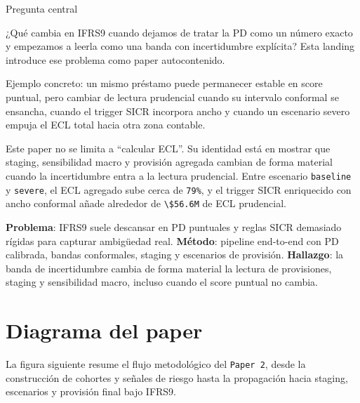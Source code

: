 \documentclass[
  spanish,
  11pt,
  letterpaper,
]{scrbook}
\theoremstyle{plain}
\theoremstyle{remark}
\begin{document}
{Pregunta central}

¿Qué cambia en IFRS9 cuando dejamos de tratar la PD como un número
exacto y empezamos a leerla como una banda con incertidumbre explícita?
Esta landing introduce ese problema como paper autocontenido.

Ejemplo concreto: un mismo préstamo puede permanecer estable en score
puntual, pero cambiar de lectura prudencial cuando su intervalo
conformal se ensancha, cuando el trigger SICR incorpora ancho y cuando
un escenario severo empuja el ECL total hacia otra zona contable.

Este paper no se limita a ``calcular ECL''. Su identidad está en mostrar
que staging, sensibilidad macro y provisión agregada cambian de forma
material cuando la incertidumbre entra a la lectura prudencial. Entre
escenario \texttt{baseline} y \texttt{severe}, el ECL agregado sube
cerca de \texttt{79\%}, y el trigger SICR enriquecido con ancho
conformal añade alrededor de \texttt{\textbackslash{}\$56.6M} de ECL
prudencial.

\begin{tcolorbox}[enhanced jigsaw, arc=.35mm, bottomrule=.15mm, bottomtitle=1mm, breakable, colback=white, colbacktitle=quarto-callout-note-color!10!white, colframe=quarto-callout-note-color-frame, coltitle=black, left=2mm, leftrule=.75mm, opacityback=0, opacitybacktitle=0.6, rightrule=.15mm, title=\textcolor{quarto-callout-note-color}{\faInfo}\hspace{0.5em}{Mini-abstract}, titlerule=0mm, toprule=.15mm, toptitle=1mm]

\textbf{Problema}: IFRS9 suele descansar en PD puntuales y reglas SICR
demasiado rígidas para capturar ambigüedad real. \textbf{Método}:
pipeline end-to-end con PD calibrada, bandas conformales, staging y
escenarios de provisión. \textbf{Hallazgo}: la banda de incertidumbre
cambia de forma material la lectura de provisiones, staging y
sensibilidad macro, incluso cuando el score puntual no cambia.

\end{tcolorbox}

\section{Diagrama del paper}\label{diagrama-del-paper}

La figura siguiente resume el flujo metodológico del \texttt{Paper\ 2},
desde la construcción de cohortes y señales de riesgo hasta la
propagación hacia staging, escenarios y provisión final bajo IFRS9.
\end{document}
